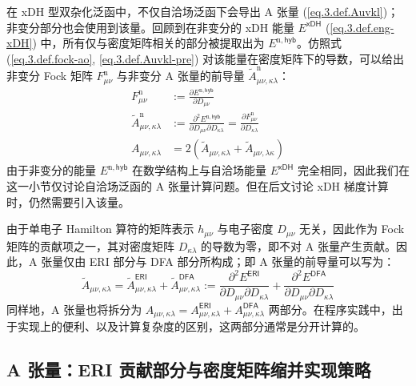 在 xDH 型双杂化泛函中，不仅自洽场泛函下会导出 A 张量 (\ref{eq.3.def.Auvkl})；非变分部分也会使用到该量。回顾到在非变分的 xDH 能量 $E^\textsf{xDH}$ (\ref{eq.3.def.eng-xDH}) 中，所有仅与密度矩阵相关的部分被提取出为 $E^{\mathrm{n}, \textsf{hyb}}$。仿照式 (\ref{eq.3.def.fock-ao}, \ref{eq.3.def.Auvkl-pre}) 对该能量在密度矩阵下的导数，可以给出非变分 Fock 矩阵 $F_{\mu \nu}^\mathrm{n}$ 与非变分 A 张量的前导量 $\tilde A_{\mu \nu, \kappa \lambda}^\mathrm{n}$：
\begin{align}
  F_{\mu \nu}^\mathrm{n} &:= \frac{\partial E^{\mathrm{n}, \textsf{hyb}}}{\partial D_{\mu \nu}} \\
  \tilde A_{\mu \nu, \kappa \lambda}^\mathrm{n} &:= \frac{\partial^2 E^{\mathrm{n}, \textsf{hyb}}}{\partial D_{\mu \nu} \partial D_{\kappa \lambda}} = \frac{\partial F_{\mu \nu}^\mathrm{n}}{\partial D_{\kappa \lambda}} \\
  A_{\mu \nu, \kappa \lambda} &= 2 (\tilde A_{\mu \nu, \kappa \lambda} + \tilde A_{\mu \nu, \lambda \kappa})
\end{align}
由于非变分的能量 $E^{\mathrm{n}, \textsf{hyb}}$ 在数学结构上与自洽场能量 $E^\textsf{xDH}$ 完全相同，因此我们在这一小节仅讨论自洽场泛函的 A 张量计算问题。但在后文讨论 xDH 梯度计算时，仍然需要引入该量。

由于单电子 Hamilton 算符的矩阵表示 $h_{\mu \nu}$ 与电子密度 $D_{\mu \nu}$ 无关，因此作为 Fock 矩阵的贡献项之一，其对密度矩阵 $D_{\kappa \lambda}$ 的导数为零，即不对 A 张量产生贡献。因此，A 张量仅由 ERI 部分与 DFA 部分所构成；即 A 张量的前导量可以写为：
\begin{equation}
  \tilde A_{\mu \nu, \kappa \lambda} = \tilde A_{\mu \nu, \kappa \lambda}^\textsf{ERI} + \tilde A_{\mu \nu, \kappa \lambda}^\textsf{DFA} := \frac{\partial^2 E^\textsf{ERI}}{\partial D_{\mu \nu} \partial D_{\kappa \lambda}} + \frac{\partial^2 E^\textsf{DFA}}{\partial D_{\mu \nu} \partial D_{\kappa \lambda}}
\end{equation}
同样地，A 张量也将拆分为 $A_{\mu \nu, \kappa \lambda} = A_{\mu \nu, \kappa \lambda}^\textsf{ERI} + A_{\mu \nu, \kappa \lambda}^\textsf{DFA}$ 两部分。在程序实践中，出于实现上的便利、以及计算复杂度的区别，这两部分通常是分开计算的。

\subsection{A 张量：ERI 贡献部分与密度矩阵缩并实现策略}

